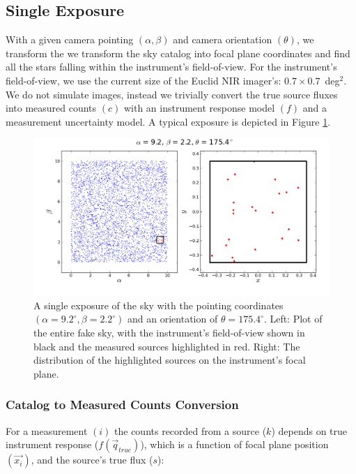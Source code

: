 \documentclass[manuscript]{aastex}
\begin{document}
\subsection{Single Exposure}
With a given camera pointing $(\alpha, \beta)$ and camera orientation $(\theta)$, we transform the we transform the sky catalog into focal plane coordinates and find all the stars falling within the instrument's field-of-view. For the instrument's field-of-view, we use the current size of the Euclid NIR imager's: $0.7 \times 0.7$~deg$^{2}$. We do not simulate images, instead we trivially convert the true source fluxes into measured counts $(c)$ with an instrument response model $(f)$ and a measurement uncertainty model. A typical exposure is depicted in Figure \ref{fig:camera}.

\begin{figure}[ht]
\begin{center}
\includegraphics[width=\textwidth]{camera_image.png}
\end{center}
\caption{A single exposure of the sky with the pointing coordinates $(\alpha = 9.2^\circ, \beta = 2.2^\circ)$ and an orientation of $\theta = 175.4^\circ$. Left: Plot of the entire fake sky, with the instrument's field-of-view shown in black and the measured sources highlighted in red. Right: The distribution of the highlighted sources on the instrument's focal plane. \label{fig:camera}}
\end{figure}

\subsubsection{Catalog to Measured Counts Conversion}
For a measurement $(i)$ the counts recorded from a source ($k$) depends on true instrument response ($f(\vec{q}_{true})$), which is a function of focal plane position $(\vec{x_i})$, and the source's true flux ($s$): 
\end{document}
